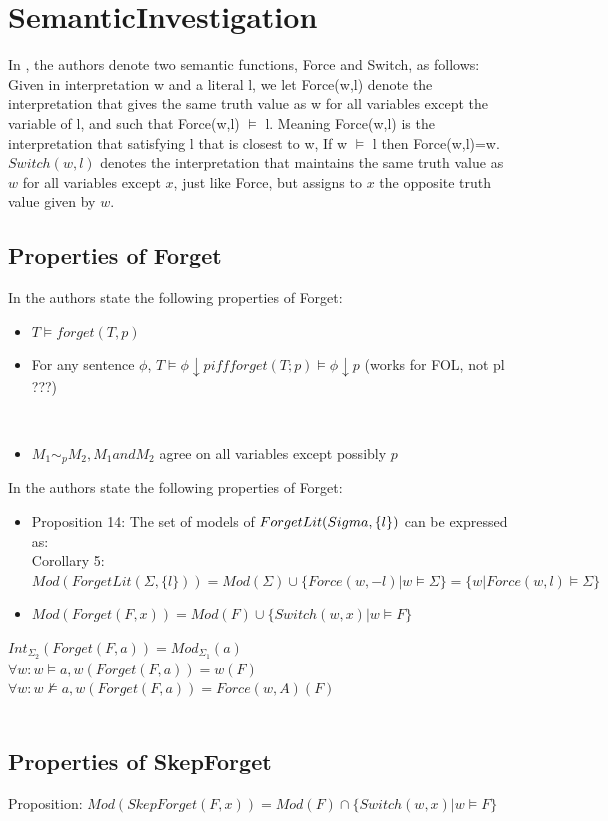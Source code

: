 \section{SemanticInvestigation}
In \cite{lang2003propositional}, the authors denote two semantic functions, Force and Switch, as follows:
Given in interpretation w and a literal l, we let Force(w,l) denote the interpretation that gives the same truth value as w 
for all variables except the variable of l, and such that Force(w,l) $\models$ l. Meaning Force(w,l) is the interpretation that 
satisfying l that is closest to w, If w $\models$ l then Force(w,l)=w.\\ $Switch(w, l)$ denotes the interpretation that maintains 
the same truth value as $w$ for all variables except $x$, just like Force, but assigns to $x$ the opposite truth value given by $w$.\\\subsection{Properties of Forget}In \cite{lin1994forget} the authors state the following properties of Forget:\\\begin{itemize}
\item $T \models forget(T,p)$
\item For any sentence $\phi$, $T \models \phi \downarrow p iff forget(T;p) \models \phi \downarrow p$ (works for FOL, not pl ???)
\end{itemize}
\cite{eiter2019brief}\\\begin{itemize}
\item $M_1 \sim_p M_2 , M_1 and M_2$ agree on all variables except possibly $p$
\end{itemize}
In \cite{lang2003propositional} the authors state the following properties of Forget:\\\begin{itemize}
\item Proposition 14: The set of models of $ForgetLit(\\Sigma,\{ l \})$ can be expressed as:\\Corollary 5: $Mod(ForgetLit(\Sigma,\{l\})) = Mod(\Sigma) \cup \{Force(w,-l) | w \models \Sigma\} = \{w | Force(w,l) \models \Sigma\}$
\item $Mod(Forget(F, x)) = Mod(F) \cup \{Switch(w, x) | w \models F\}$\\
\end{itemize}
$Int_{\Sigma_2}(Forget(F,a)) = Mod_{\Sigma_1}(a)$\\$\forall w : w \models a, w(Forget(F,a)) = w(F)$\\$\forall w : w \not\models a, w(Forget(F,a)) = Force(w,A)(F)$\\\\\subsection{Properties of SkepForget}Proposition: $Mod({SkepForget}(F, x)) = Mod(F) \cap \{Switch(w, x) | w \models F\}$ \\\\
